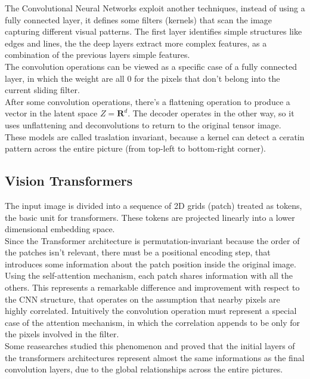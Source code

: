 \documentclass[preprint]{main}
\begin{document}
The Convolutional Neural Networks exploit another techniques, instead of using a fully connected layer, it defines some filters (kernels) that scan the image capturing different visual patterns.
The first layer identifies simple structures like edges and lines, the the deep layers extract more complex features, as a combination of the previous layers simple features.   \\
The convolution operations can be viewed as a specific case of a fully connected layer, in which the weight are all $0$ for the pixels that don't belong into the current sliding filter. \\
After some convolution operations, there's a flattening operation to produce a vector in the latent space $Z = \mathbf{R}^d$.
The decoder operates in the other way, so it uses unflattening and deconvolutions to return to the original tensor image. \\
These models are called traslation invariant, because a kernel can detect a ceratin pattern across the entire picture (from top-left to bottom-right corner).

\subsection{Vision Transformers}

The input image is divided into a sequence of 2D grids (patch) treated as tokens, the basic unit for transformers.
These tokens are projected linearly into a lower dimensional embedding space. \\
Since the Transformer architecture is permutation-invariant because the order of the patches isn't relevant, there must be a positional encoding step, that introduces some information about the patch position inside the original image. \\
Using the self-attention mechanism, each patch shares information with all the others.
This represents a remarkable difference and improvement with respect to the CNN structure, that operates on the assumption that nearby pixels are highly correlated.
Intuitively the convolution operation must represent a special case of the attention mechanism, in which the correlation appends to be only for the pixels involved in the filter. \\
Some reasearches studied this phenomenon \cite{cordonnier2020relationshipselfattentionconvolutionallayers} and proved that the initial layers of the transformers architectures represent almost the same informations as the final convolution layers, due to the global relationships across the entire pictures.
\end{document}
